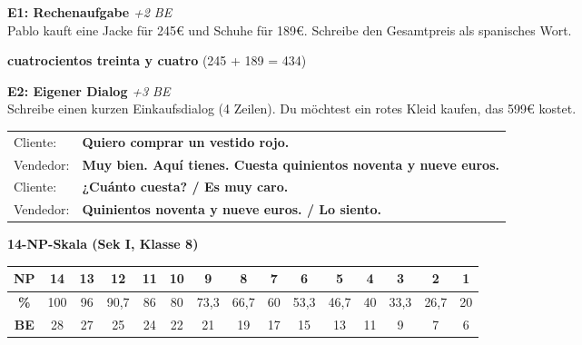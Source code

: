 \documentclass[11pt, a4paper]{article}
\newcommand{\lsg}[1]{\textcolor{loesung}{\textbf{#1}}}
\begin{document}
\begin{tcolorbox}[colback=white, colframe=grau, boxrule=0.5pt, arc=0pt,
    left=6pt, right=6pt, top=4pt, bottom=4pt, title={\small\textbf{Extension Tasks (★★★) -- Für Schnelle}}]
\small

\textbf{E1: Rechenaufgabe} \hfill \textit{+2 BE}\\
Pablo kauft eine Jacke für 245€ und Schuhe für 189€.
Schreibe den Gesamtpreis als spanisches Wort.

\vspace{3pt}
\lsg{cuatrocientos treinta y cuatro} (245 + 189 = 434)

\vspace{6pt}

\textbf{E2: Eigener Dialog} \hfill \textit{+3 BE}\\
Schreibe einen kurzen Einkaufsdialog (4 Zeilen). Du möchtest ein rotes Kleid kaufen, das 599€ kostet.

\vspace{3pt}
\begin{tabular}{@{}p{1.8cm}p{12cm}@{}}
Cliente: & \lsg{Quiero comprar un vestido rojo.} \\[0.5em]
Vendedor: & \lsg{Muy bien. Aquí tienes. Cuesta quinientos noventa y nueve euros.} \\[0.5em]
Cliente: & \lsg{¿Cuánto cuesta? / Es muy caro.} \\[0.5em]
Vendedor: & \lsg{Quinientos noventa y nueve euros. / Lo siento.} \\
\end{tabular}

\end{tcolorbox}

\vspace{4pt}

\begin{center}
\small
\textbf{14-NP-Skala (Sek I, Klasse 8)}

\vspace{3pt}

\scriptsize
\begin{tabular}{|c|c|c|c|c|c|c|c|c|c|c|c|c|c|c|}
\hline
\textbf{NP} & 14 & 13 & 12 & 11 & 10 & 9 & 8 & 7 & 6 & 5 & 4 & 3 & 2 & 1 \\
\hline
\textbf{\%} & 100 & 96 & 90,7 & 86 & 80 & 73,3 & 66,7 & 60 & 53,3 & 46,7 & 40 & 33,3 & 26,7 & 20 \\
\hline
\textbf{BE} & 28 & 27 & 25 & 24 & 22 & 21 & 19 & 17 & 15 & 13 & 11 & 9 & 7 & 6 \\
\hline
\end{tabular}
\end{center}
\end{document}
